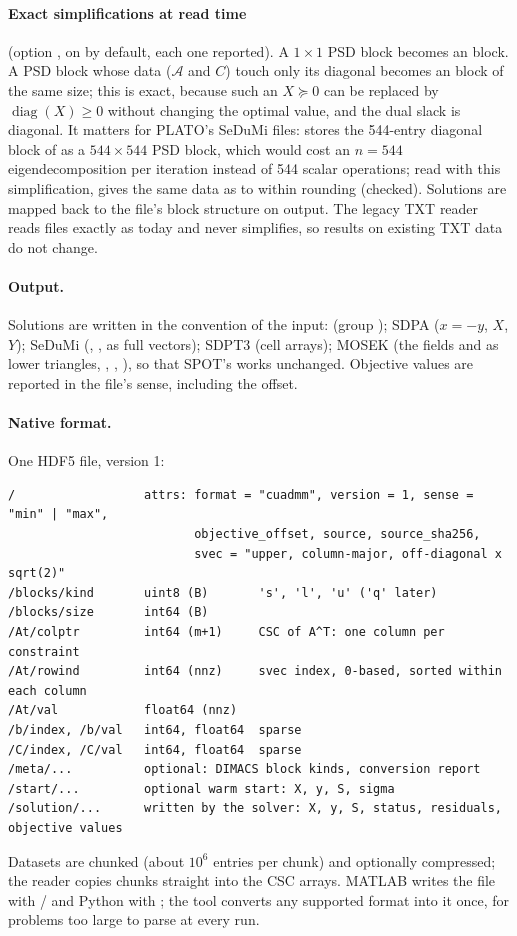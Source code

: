 \documentclass[11pt]{article}
\newcommand{\A}{\mathcal{A}}
\begin{document}
\paragraph{Exact simplifications at read time} (option , on by default, each one reported).
A $1\times1$ PSD block becomes an  block. A PSD block whose data ($\A$ and $C$) touch only its diagonal
becomes an  block of the same size; this is exact, because such an $X\succeq0$ can be replaced by
$\operatorname{diag}(X)\ge0$ without changing the optimal value, and the dual slack is diagonal. It matters for
PLATO's SeDuMi files:  stores the 544-entry diagonal block of  as a
$544\times544$ PSD block, which would cost an $n = 544$ eigendecomposition per iteration instead of 544 scalar
operations; read with this simplification,  gives the same data as  to within
rounding (checked). Solutions are mapped back to the file's block structure on output. The legacy TXT reader
reads files exactly as today and never simplifies, so results on existing TXT data do not change.

\paragraph{Output.} Solutions are written in the convention of the input:  (group );
SDPA ($x = -y$, $X$, $Y$); SeDuMi (, ,  as full vectors); SDPT3 (cell arrays); MOSEK (the
 fields  and  as lower triangles, , , ), so that SPOT's
 works unchanged. Objective values are reported in the file's sense, including the
offset.

\paragraph{Native format.} One HDF5 file, version 1:
\begin{lstlisting}[style=plain]
/                  attrs: format = "cuadmm", version = 1, sense = "min" | "max",
                          objective_offset, source, source_sha256,
                          svec = "upper, column-major, off-diagonal x sqrt(2)"
/blocks/kind       uint8 (B)       's', 'l', 'u' ('q' later)
/blocks/size       int64 (B)
/At/colptr         int64 (m+1)     CSC of A^T: one column per constraint
/At/rowind         int64 (nnz)     svec index, 0-based, sorted within each column
/At/val            float64 (nnz)
/b/index, /b/val   int64, float64  sparse
/C/index, /C/val   int64, float64  sparse
/meta/...          optional: DIMACS block kinds, conversion report
/start/...         optional warm start: X, y, S, sigma
/solution/...      written by the solver: X, y, S, status, residuals, objective values
\end{lstlisting}
Datasets are chunked (about $10^6$ entries per chunk) and optionally compressed; the reader copies chunks
straight into the CSC arrays. MATLAB writes the file with / and Python with
; the tool  converts any supported format into it once, for problems too large to
parse at every run.
\end{document}
